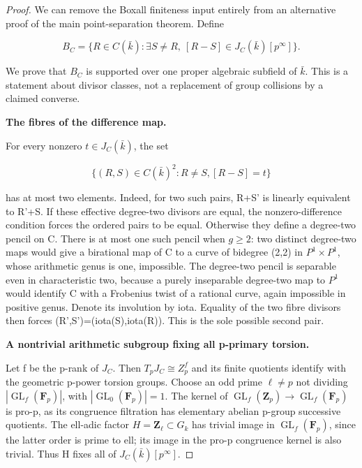 \documentclass[11pt,a4paper]{article}
\begin{document}
\begin{proof}

We can remove the Boxall finiteness input entirely from an alternative proof of the main point-separation theorem. Define

\[B_C=\{R\in C(\bar k):\exists S\ne R,\ [R-S]\in J_C(\bar k)[p^\infty]\}.\]

We prove that \(B_C\) is supported over one proper algebraic subfield of \(\bar k\). This is a statement about divisor classes, not a replacement of group collisions by a claimed converse.

\textbf{The fibres of the difference map.}

For every nonzero \(t{\in}J_C(\bar k)\), the set

\[\{(R,S)\in C(\bar k)^2:R\ne S,[R-S]=t\}\]

has at most two elements. Indeed, for two such pairs, R+S' is linearly equivalent to R'+S. If these effective degree-two divisors are equal, the nonzero-difference condition forces the ordered pairs to be equal. Otherwise they define a degree-two pencil on C. There is at most one such pencil when \(g{\ge}2\): two distinct degree-two maps would give a birational map of C to a curve of bidegree (2,2) in \(P^1{\times}P^1\), whose arithmetic genus is one, impossible. The degree-two pencil is separable even in characteristic two, because a purely inseparable degree-two map to \(P^1\) would identify C with a Frobenius twist of a rational curve, again impossible in positive genus. Denote its involution by iota. Equality of the two fibre divisors then forces (R',S')=(iota(S),iota(R)). This is the sole possible second pair.

\textbf{A nontrivial arithmetic subgroup fixing all p-primary torsion.}

Let f be the p-rank of \(J_C\). Then \(T_pJ_C\cong Z_p^f\) and its finite quotients identify with the geometric p-power torsion groups. Choose an odd prime \(\ell{\ne}p\) not dividing \(|\operatorname{GL}_f(\mathbf{F}_p)|\), with \(|\operatorname{GL}_0(\mathbf{F}_p)|=1\). The kernel of \(\operatorname{GL}_f(\mathbf{Z}_p){\to}\operatorname{GL}_f(\mathbf{F}_p)\) is pro-p, as its congruence filtration has elementary abelian p-group successive quotients. The ell-adic factor \(H=\mathbf{Z}_\ell{\subset}G_k\) has trivial image in \(\operatorname{GL}_f(\mathbf{F}_p)\), since the latter order is prime to ell; its image in the pro-p congruence kernel is also trivial. Thus H fixes all of \(J_C(\bar k)[p^{\infty}]\).


\end{proof}
\end{document}
